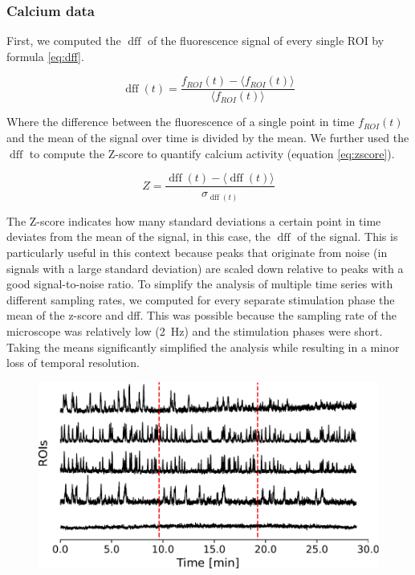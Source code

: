 \subsubsection{Calcium data}

First, we computed the $\operatorname{dff}$ of the fluorescence signal of every single ROI by formula \ref{eq:dff}.

\begin{equation}
    \operatorname{dff}(t) = \frac{f_{ROI}(t) - \langle f_{ROI}(t) \rangle}{\langle f_{ROI}(t) \rangle}
    \label{eq:dff}
\end{equation}

Where the difference between the fluorescence of a single point in time $f_{ROI}(t)$ and the mean of the signal over time is divided by the mean. We further used the $\operatorname{dff}$ to compute the Z-score to quantify calcium activity (equation \ref{eq:zscore}).

\begin{equation}
    Z = \frac{\operatorname{dff}(t) - \langle \operatorname{dff}(t) \rangle}{\sigma_{\operatorname{dff}(t)}}
    \label{eq:zscore}
\end{equation}

The Z-score indicates how many standard deviations a certain point in time deviates from the mean of the signal, in this case, the $\operatorname{dff}$ of the signal. This is particularly useful in this context because peaks that originate from noise (in signals with a large standard deviation) are scaled down relative to peaks with a good signal-to-noise ratio. To simplify the analysis of multiple time series with different sampling rates, we computed for every separate stimulation phase the mean of the z-score and dff. This was possible because the sampling rate of the microscope was relatively low (\SI{2}{\hertz}) and the stimulation phases were short. Taking the means significantly simplified the analysis while resulting in a minor loss of temporal resolution.

\vspace{\baselineskip}

\begin{figure}[ht]
    \centering
    \includegraphics[width=0.8\linewidth]{figures/autocorrelation.pdf}
    \label{fig:autocorrelation}
\end{figure}

